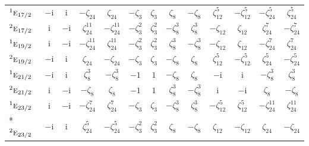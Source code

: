 \documentclass[10pt,a4paper]{article}
\numberwithin{equation}{section}
\newcommand{\irr}[1]{\text{\normalfont\scshape #1}}
\newcommand{\conjpair}[1]{{}^{#1}}
\newcommand{\iunit}{\mathrm{i}}
\newcommand{\rootunity}[1]{\zeta_{#1}}
\begin{document}
{\begin{longtable}{@{}lcccccccccccc@{}}
$\conjpair{1}\irr{e}_{17/2}$ & $-\iunit{}$ & $\iunit{}$ & $-\rootunity{24}$ & $\rootunity{24}$ & $-\rootunity{3}$ & $\rootunity{3}$ & $\rootunity{8}$ & $-\rootunity{8}$ & $\rootunity{12}^{5}$ & $-\rootunity{12}^{5}$ & $-\rootunity{24}^{5}$ & $\rootunity{24}^{5}$\\
$\conjpair{2}\irr{e}_{17/2}$ & $\iunit{}$ & $-\iunit{}$ & $\rootunity{24}^{11}$ & $-\rootunity{24}^{11}$ & $-\rootunity{3}^{2}$ & $\rootunity{3}^{2}$ & $-\rootunity{8}^{3}$ & $\rootunity{8}^{3}$ & $-\rootunity{12}$ & $\rootunity{12}$ & $\rootunity{24}^{7}$ & $-\rootunity{24}^{7}$\\
$\conjpair{1}\irr{e}_{19/2}$ & $\iunit{}$ & $-\iunit{}$ & $-\rootunity{24}^{11}$ & $\rootunity{24}^{11}$ & $-\rootunity{3}^{2}$ & $\rootunity{3}^{2}$ & $\rootunity{8}^{3}$ & $-\rootunity{8}^{3}$ & $-\rootunity{12}$ & $\rootunity{12}$ & $-\rootunity{24}^{7}$ & $\rootunity{24}^{7}$\\
$\conjpair{2}\irr{e}_{19/2}$ & $-\iunit{}$ & $\iunit{}$ & $\rootunity{24}$ & $-\rootunity{24}$ & $-\rootunity{3}$ & $\rootunity{3}$ & $-\rootunity{8}$ & $\rootunity{8}$ & $\rootunity{12}^{5}$ & $-\rootunity{12}^{5}$ & $\rootunity{24}^{5}$ & $-\rootunity{24}^{5}$\\
$\conjpair{1}\irr{e}_{21/2}$ & $-\iunit{}$ & $\iunit{}$ & $\rootunity{8}^{3}$ & $-\rootunity{8}^{3}$ & $-1$ & $1$ & $-\rootunity{8}$ & $\rootunity{8}$ & $-\iunit{}$ & $\iunit{}$ & $-\rootunity{8}^{3}$ & $\rootunity{8}^{3}$\\
$\conjpair{2}\irr{e}_{21/2}$ & $\iunit{}$ & $-\iunit{}$ & $-\rootunity{8}$ & $\rootunity{8}$ & $-1$ & $1$ & $\rootunity{8}^{3}$ & $-\rootunity{8}^{3}$ & $\iunit{}$ & $-\iunit{}$ & $\rootunity{8}$ & $-\rootunity{8}$\\
$\conjpair{1}\irr{e}_{23/2}$ & $\iunit{}$ & $-\iunit{}$ & $-\rootunity{24}^{7}$ & $\rootunity{24}^{7}$ & $-\rootunity{3}$ & $\rootunity{3}$ & $-\rootunity{8}^{3}$ & $\rootunity{8}^{3}$ & $-\rootunity{12}^{5}$ & $\rootunity{12}^{5}$ & $-\rootunity{24}^{11}$ & $\rootunity{24}^{11}$\\*
$\conjpair{2}\irr{e}_{23/2}$ & $-\iunit{}$ & $\iunit{}$ & $\rootunity{24}^{5}$ & $-\rootunity{24}^{5}$ & $-\rootunity{3}^{2}$ & $\rootunity{3}^{2}$ & $\rootunity{8}$ & $-\rootunity{8}$ & $\rootunity{12}$ & $-\rootunity{12}$ & $\rootunity{24}$ & $-\rootunity{24}$\\
\bottomrule\end{longtable}}
\end{document}
